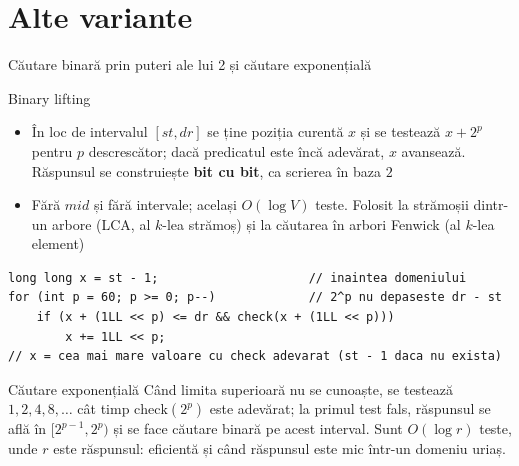 \documentclass[8pt,mathserif]{beamer}
\begin{document}
\section{Alte variante}

\begin{frame}[fragile]{Căutare binară prin puteri ale lui 2 și căutare exponențială}
  \lstset{basicstyle=\ttfamily\footnotesize}
  \begin{block}{Binary lifting}
    \begin{itemize}
      \item În loc de intervalul $[st, dr]$ se ține poziția curentă $x$ și se testează $x + 2^p$ pentru $p$ descrescător; dacă predicatul este încă adevărat, $x$ avansează. Răspunsul se construiește \textbf{bit cu bit}, ca scrierea în baza $2$
      \item Fără $mid$ și fără intervale; același $O(\log V)$ teste. Folosit la strămoșii dintr-un arbore (LCA, al $k$-lea strămoș) și la căutarea în arbori Fenwick (al $k$-lea element)
    \end{itemize}
  \end{block}
  \begin{lstlisting}
long long x = st - 1;                     // inaintea domeniului
for (int p = 60; p >= 0; p--)             // 2^p nu depaseste dr - st
    if (x + (1LL << p) <= dr && check(x + (1LL << p)))
        x += 1LL << p;
// x = cea mai mare valoare cu check adevarat (st - 1 daca nu exista)
  \end{lstlisting}
  \begin{block}{Căutare exponențială}
    Când limita superioară nu se cunoaște, se testează $1, 2, 4, 8, \dots$ cât timp $\mathrm{check}(2^p)$ este adevărat; la primul test fals, răspunsul se află în $[2^{p-1}, 2^p)$ și se face căutare binară pe acest interval. Sunt $O(\log r)$ teste, unde $r$ este răspunsul: eficientă și când răspunsul este mic într-un domeniu uriaș.
  \end{block}
\end{frame}
\end{document}
